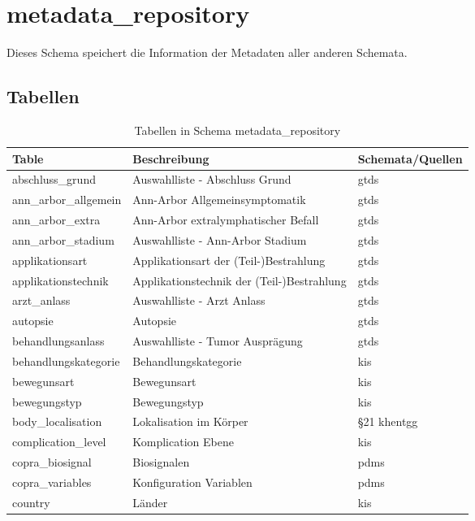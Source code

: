   \section{metadata\_repository}
  Dieses Schema speichert die Information der Metadaten aller anderen Schemata.
  
  \subsection{Tabellen}
  \label{tb:metarepo}
  \begin{longtable}{||p{5cm}|p{7cm}|p{4cm}||}  	
  	\caption{Tabellen in Schema metadata\_repository} \\  	
  	\hline Table & Beschreibung & Schemata/Quellen\\ \hline \hline
  	abschluss\_grund & Auswahlliste - Abschluss Grund & \ac{gtds} \\ \hline
  	ann\_arbor\_allgemein & Ann-Arbor Allgemeinsymptomatik & \ac{gtds} \\ \hline
  	ann\_arbor\_extra & Ann-Arbor extralymphatischer Befall &  \ac{gtds} \\ \hline
  	ann\_arbor\_stadium & Auswahlliste - Ann-Arbor Stadium & \ac{gtds} \\ \hline
  	applikationsart & Applikationsart der (Teil-)Bestrahlung & \ac{gtds} \\ \hline
  	applikationstechnik & Applikationstechnik der (Teil-)Bestrahlung & \ac{gtds} \\ \hline
  	arzt\_anlass & Auswahlliste - Arzt Anlass & \ac{gtds}\\ \hline
  	autopsie & Autopsie & \ac{gtds} \\ \hline
  	behandlungsanlass & Auswahlliste - Tumor Ausprägung & \ac{gtds} \\ \hline
  	behandlungskategorie & Behandlungskategorie & \ac{kis} \\ \hline
  	bewegunsart & Bewegunsart  & \ac{kis} \\ \hline
  	bewegungstyp & Bewegungstyp  & \ac{kis} \\ \hline
  	body\_localisation & Lokalisation im Körper & \S 21 \ac{khentgg} \\ \hline
  	complication\_level & Komplication Ebene & \ac{kis} \\ \hline
  	copra\_biosignal & Biosignalen & \ac{pdms} \\ \hline
  	copra\_variables & Konfiguration Variablen & \ac{pdms} \\ \hline
  	country & Länder & \ac{kis} \\ \hline

\end{longtable}
